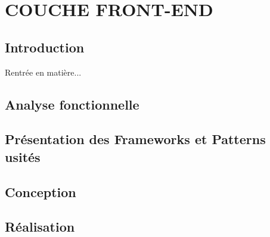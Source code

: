 \setcounter{chapter}{3}
\chapter{          COUCHE FRONT-END}
\minitoc %
\graphicspath{{Chapitre4/figures/}}


\pagestyle{fancy}
\fancyhf{}
\fancyhead[R]{\bfseries\rightmark}
\fancyfoot[R]{\thepage}
\renewcommand{\headrulewidth}{0.5pt}
\renewcommand{\footrulewidth}{0pt}
\renewcommand{\chaptermark}[1]{\markboth{\MakeUppercase{\chaptername~\thechapter. #1 }}{}}
\renewcommand{\sectionmark}[1]{\markright{\thechapter.\thesection~ #1}}

\begin{spacing}{1.5}

\section*{Introduction}
Rentrée en matière...

\section*{Analyse fonctionnelle}



\section{Présentation des Frameworks et Patterns usités}


\section{Conception}


\section{Réalisation}



\end{spacing}
